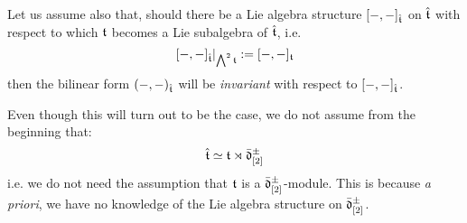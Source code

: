             \begin{convention}
                Let us assume also that, should there be a Lie algebra structure $[-, -]_{\hat{\mathfrak{t}}}$ on $\hat{\mathfrak{t}}$ with respect to which $\mathfrak{t}$ becomes a Lie subalgebra of $\hat{\mathfrak{t}}$, i.e.
                    $$[-, -]_{\hat{\mathfrak{t}}}|_{\bigwedge^2 \mathfrak{t}} := [-, -]_{\mathfrak{t}}$$
                then the bilinear form $(-, -)_{\hat{\mathfrak{t}}}$ will be \textit{invariant} with respect to $[-, -]_{\hat{\mathfrak{t}}}$.

                Even though this will turn out to be the case, we do not assume from the beginning that:
                    $$\hat{\mathfrak{t}} \simeq \mathfrak{t} \rtimes \bar{\mathfrak{d}}_{[2]}^{\pm}$$
                i.e. we do not need the assumption that $\mathfrak{t}$ is a $\bar{\mathfrak{d}}_{[2]}^{\pm}$-module. This is because \textit{a priori}, we have no knowledge of the Lie algebra structure on $\bar{\mathfrak{d}}_{[2]}^{\pm}$.
            \end{convention}


